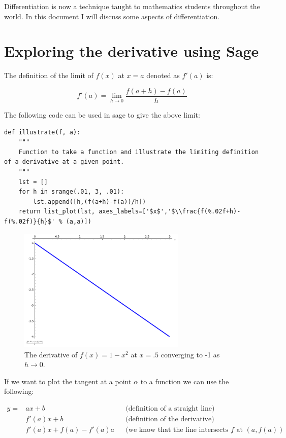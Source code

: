 \documentclass[a4paper]{article}
\theoremstyle{break}
\begin{document}
Differentiation is now a technique taught to mathematics students throughout the world. In this document I will discuss some aspects of differentiation.

\section{Exploring the derivative using Sage}

The definition of the limit of $f(x)$ at $x=a$ denoted as $f'(a)$ is:

\begin{equation}
f'(a) = \lim_{h\to0}\frac{f(a+h)-f(a)}{h}
\end{equation}

The following code can be used in sage to give the above limit:

\begin{verbatim}
def illustrate(f, a):
    """
    Function to take a function and illustrate the limiting definition of a derivative at a given point.
    """
    lst = []
    for h in srange(.01, 3, .01):
    	lst.append([h,(f(a+h)-f(a))/h])
    return list_plot(lst, axes_labels=['$x$','$\\frac{f(%.02f+h)-f(%.02f)}{h}$' % (a,a)])
\end{verbatim}

\begin{figure}[!htbp]
\begin{center}
\includegraphics[width=8cm]{sage1.png}
\end{center}
\caption{The derivative of $f(x)=1-x^2$ at $x=.5$ converging to -1 as $h\to0$.}
\end{figure}

If we want to plot the tangent at a point $\alpha$ to a function we can use the following:

\begin{align}
y=&ax+b&&\text{(definition of a straight line)}\nonumber\\
  &f'(a)x+b&&\text{(definition of the derivative)}\nonumber\\
  &f'(a)x+f(a)-f'(a)a&&\text{(we know that the line intersects $f$ at $(a,f(a))$}\nonumber
\end{align}
\end{document}
